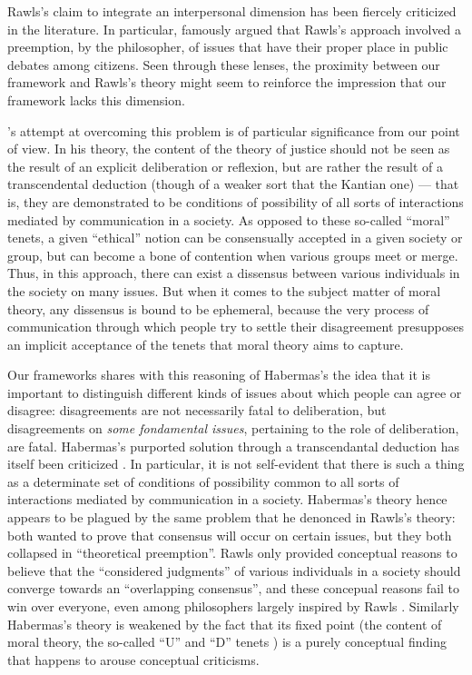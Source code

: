 \documentclass[version=3.21, pagesize, twoside=off, bibliography=totoc, DIV=calc, fontsize=12pt, a4paper, french, english]{scrartcl}
\begin{document}
Rawls's claim to integrate an interpersonal dimension has been fiercely criticized in the literature. 
In particular, \citet{habermas_short_1999} famously argued that Rawls's approach involved a preemption, by the philosopher, of issues that have their proper place in public debates among citizens. 
Seen through these lenses, the proximity between our framework and Rawls's theory might seem to reinforce the impression that our framework lacks this dimension.

\citeauthor{habermas_moralbewustsein_1983}'s \citeyearpar{habermas_moralbewustsein_1983} attempt at overcoming this problem is of particular significance from our point of view. 
In his theory, the content of the theory of justice should not be seen as the result of an explicit deliberation or reflexion, but are rather the result of a transcendental deduction (though of a weaker sort that the Kantian one) --- that is, they are demonstrated to be conditions of possibility of all sorts of interactions mediated by communication in a society. As opposed to these so-called “moral” tenets, a given “ethical” notion can be consensually accepted in a given society or group, but can become a bone of contention when various groups meet or merge. 
Thus, in this approach, there can exist a dissensus between various individuals in the society on many issues. 
But when it comes to the subject matter of moral theory, any dissensus is bound to be ephemeral, because the very process of communication through which people try to settle their disagreement presupposes an implicit acceptance of the tenets that moral theory aims to capture.

Our frameworks shares with this reasoning of Habermas's the idea that it is important to distinguish different kinds of issues about which people can agree or disagree: disagreements are not necessarily fatal to deliberation, but disagreements on \emph{some fondamental issues}, pertaining to the role of deliberation, are fatal. Habermas's purported solution through a transcendantal deduction has itself been criticized \citep{heath_communicative_2001}. 
In particular, it is not self-evident that there is such a thing as a determinate set of conditions of possibility common to all sorts of interactions mediated by communication in a society. 
Habermas's theory hence appears to be plagued by the same problem that he denonced in Rawls's theory: both wanted to prove that consensus will occur on certain issues, but they both collapsed in ``theoretical preemption''. Rawls only provided conceptual reasons to believe that the “considered judgments” of various individuals in a society should converge towards an “overlapping consensus”, and these concepual reasons fail to win over everyone, even among philosophers largely inspired by Rawls \citep{estlund_insularity_1998, estlund_democratic_2009}. 
Similarly Habermas's theory is weakened by the fact that its fixed point (the content of moral theory, the so-called “U” and “D” tenets \citep{habermas_moralbewustsein_1983}) is a purely conceptual finding that happens to arouse conceptual criticisms.
\end{document}
